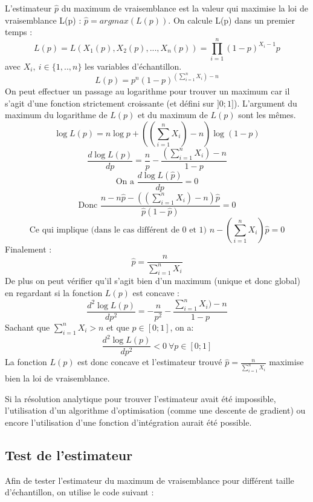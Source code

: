 \documentclass[12pt,a4paper,titlepage]{article}
\begin{document}
L'estimateur $\hat{p}$ du maximum de vraisemblance est la valeur qui
maximise la loi de vraisemblance L(p) : $\hat{p}=argmax(L(p))$.
On calcule L(p) dans un premier temps :
\[L(p)=L(X_1(p),X_2(p),...,X_n(p))=\prod\limits_{i=1}^{n}(1-p)^{X_i-1}p 
\]
avec $X_i,\ i\in\{1,..,n\}$ les variables d'échantillon.
\[L(p)=p^n(1-p)^{(\sum\limits_{i=1}^{n}X_i)-n}\]
On peut effectuer un passage au logarithme pour trouver un maximum car il s'agit
d'une fonction strictement croissante (et défini sur $]0;1]$). L'argument du maximum du logarithme
de $L(p)$ et du maximum de $L(p)$ sont les mêmes.
\[\log{L(p)}=n\log{p}+((\sum\limits_{i=1}^{n}X_i)-n)\log{(1-p)}\]
\[\frac{d\log{L(p)}}{dp}=\frac{n}{p}-\frac{(\sum\limits_{i=1}^{n}X_i)-n}{1-p}\]
\[\text{On a }\frac{d\log{L(\hat{p})}}{dp}=0\]
\[\text{Donc }\frac{n-n\hat{p}-((\sum\limits_{i=1}^{n}X_i)-n)\hat{p}}{\hat{p}(1-\hat{p})}=0\]
\[\text{Ce qui implique (dans le cas différent de 0 et 1) }n-(\sum\limits_{i=1}^{n}X_i)\hat{p}=0\]
Finalement :
\[\hat{p} = \frac{n}{\sum\limits_{i=1}^{n}X_i}\]
De plus on peut vérifier qu'il s'agit bien d'un maximum (unique et donc global) en regardant si la fonction $L(p)$ est concave :
\[\frac{d^2\log{L(p)}}{dp^2} = -\frac{n}{p^2}-\frac{\sum\limits_{i=1}^{n}X_i)-n}{1-p}\]
Sachant que $\sum\limits_{i=1}^{n}X_i > n $
et que $p\in[0;1]$, on a:
\[\frac{d^2 \log{L(p)}}{dp^2}<0 \ \forall p\in[0;1]\]
La fonction $L(p)$ est donc concave et l'estimateur trouvé $\hat{p} = \frac{n}{\sum\limits_{i=1}^{n}X_i}$ maximise bien la loi de vraisemblance.

Si la résolution analytique pour trouver l'estimateur avait été impossible,
l'utilisation d'un algorithme d'optimisation (comme une descente de gradient) ou encore
l'utilisation d'une fonction d'intégration aurait été possible.

\subsection{Test de l'estimateur}

Afin de tester l'estimateur du maximum de vraisemblance pour différent taille
d'échantillon, on utilise le code suivant :


\end{document}
